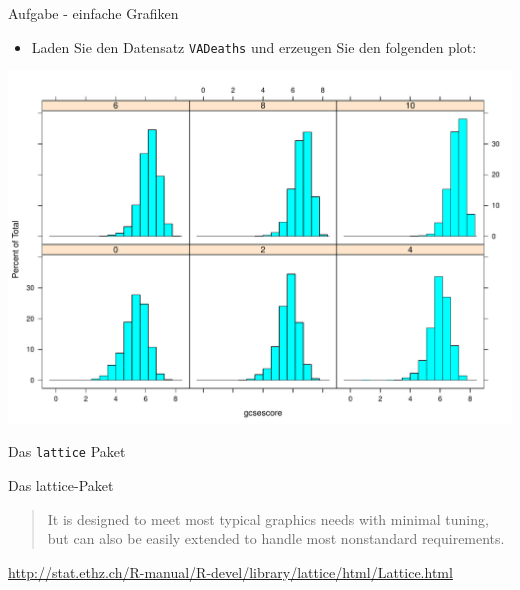 \documentclass[ignorenonframetext,]{beamer}
\providecommand{\tightlist}{%
\setlength{\itemsep}{0pt}\setlength{\parskip}{0pt}}
\begin{document}
\begin{frame}[fragile]{Aufgabe - einfache Grafiken}

\begin{itemize}
\tightlist
\item
  Laden Sie den Datensatz \texttt{VADeaths} und erzeugen Sie den
  folgenden plot:
\end{itemize}

\includegraphics{R_intern_files/figure-beamer/unnamed-chunk-221-1.pdf}

\end{frame}

\begin{frame}{Das \texttt{lattice} Paket}

\end{frame}

\begin{frame}{Das lattice-Paket}

\begin{quote}
It is designed to meet most typical graphics needs with minimal tuning,
but can also be easily extended to handle most nonstandard requirements.
\end{quote}

\url{http://stat.ethz.ch/R-manual/R-devel/library/lattice/html/Lattice.html}

\end{frame}
\end{document}

